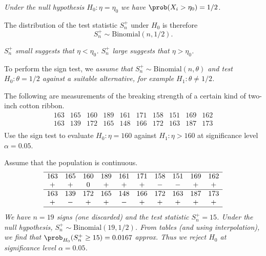 \bit
\it Under the null hypothesis $H_0:\eta=\eta_0$ we have $\prob(X_i>\eta_0)=1/2$.
\eit

\vspace*{2ex}
The distribution of the test statistic $S^{+}_n$ under $H_0$ is therefore
\[
S^{+}_n\sim\text{Binomial}(n,1/2).
\]

\bit
\it $S^{+}_n$ small suggests that $\eta < \eta_0$.
\it $S^{+}_n$ large suggests that $\eta > \eta_0$.
\eit


\vspace*{2ex}
To perform the sign test, we 
\bit
\it assume that $S^{+}_n\sim\text{Binomial}(n,\theta)$ and
\it test $H_0:\theta = 1/2$ against a suitable alternative, for example $H_1:\theta\neq 1/2$. 
\eit


\begin{example}
The following are measurements of the breaking strength of a certain kind of two-inch cotton ribbon.
\[\begin{array}{cccccccccc}
163 & 165 & 160 & 189 & 161 & 171 & 158 & 151 & 169 & 162 \\
163 & 139 & 172 & 165 & 148 & 166 & 172 & 163 & 187 & 173 \\
\end{array}\]
Use the sign test to evaluate $H_0:\eta=160$ against $H_1:\eta>160$ at significance level $\alpha=0.05$.
\end{example}

\begin{solution}
Assume that the population is continuous. 
\small
\[\begin{array}{cccccccccc} \hline
163 & 165 & 160 & 189 & 161 & 171 & 158 & 151 & 169 & 162 \\
+ & + & 0 & + & + & + & - & - & + & + \\ \hline
163 & 139 & 172 & 165 & 148 & 166 & 172 & 163 & 187 & 173 \\
+ & - & + & + & - & + & + & + & + & + \\ \hline
\end{array}\]
\normalsize
\bit
\it We have $n=19$ signs (one discarded) and the test statistic $S^{+}_n=15$. 
\it Under the null hypothesis, $S^{+}_n\sim\text{Binomial}(19,1/2)$. 
\it From tables (and using interpolation), we find that $\prob_{H_0}(S^{+}_n\geq 15) = 0.0167$ approx. 
\it Thus we reject $H_0$ at significance level $\alpha=0.05$.
\eit
\end{solution}


